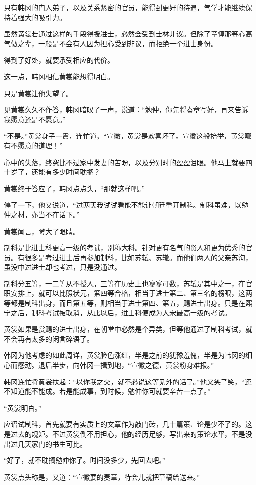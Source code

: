只有韩冈的门人弟子，以及关系紧密的官员，能得到更好的待遇，气学才能继续保持着强大的吸引力。

虽然黄裳若通过这样的手段得授进士，必然会受到士林非议。但除了章惇那等心高气傲之辈，一般是不会有人因为担心受到非议，而拒绝一个进士身份。

得到了好处，就要承受相应的代价。

这一点，韩冈相信黄裳能想得明白。

只是黄裳让他失望了。

见黄裳久久不作答，韩冈暗叹了一声，说道：“勉仲，你先将奏章写好，再来告诉我愿意还是不愿意。”

“不是。”黄裳身子一震，连忙道，“宣徽，黄裳是欢喜坏了。宣徽这般抬举，黄裳哪有不愿意的道理！”

心中的失落，终究比不过家中发妻的苦盼，以及分别时的盈盈泪眼。他马上就要四十岁了，还能有多少时间耽搁？

黄裳终于答应了，韩冈点点头，“那就这样吧。”

停了一下，他又说道，“过两天我试试看能不能让朝廷重开制科。制科虽难，以勉仲之材，亦当不在话下。”

黄裳闻言，瞪大了眼睛。

制科是比进士科更高一级的考试，别称大科。针对更有名气的贤人和更为优秀的官员。有很多是考过进士后再参加制科，比如苏轼、苏辙。而他们两人的父亲苏洵，虽没中过进士却也考过，只是没通过。

制科分五等，一二等从不授人，三等在历史上也寥寥可数，苏轼是其中之一，在官职安排上，就可以比照状元，第四等合格，相当于进士第二、第三名的榜眼，这两等都是制科出身，而且第五等，则相当于进士第四、第五，赐进士出身。只是在熙宁之后，制科考试被取消，从此以后，进士科便成为大宋最高一级的考试。

黄裳如果是赏赐的进士出身，在朝堂中必然是个异类，但等他通过了制科考试，就不会再有太多的闲言碎语了。

韩冈为他考虑的如此周详，黄裳脸色涨红，半是之前的犹豫羞愧，半是为韩冈的细心而感动。退后半步，向韩冈一揖到地，“宣徽之德，黄裳粉身难报。”

韩冈连忙将黄裳扶起：“以你我之交，就不必说这等见外的话了。”他又笑了笑，“还不知道能不能成。若是能成事，到时候，勉仲你可就要辛苦一点了。”

“黄裳明白。”

应诏试制科，首先就要有实质上的文章作为敲门砖，几十篇策、论是少不了的。这是过去的规矩。不过黄裳倒不用担心，他的经历足够，写出来的策论水平，不是没出过几天家门的书生可比。

“好了，就不耽搁勉仲你了。时间没多少，先回去吧。”

黄裳点头称是，又道：“宣徽要的奏章，待会儿就把草稿给送来。”

